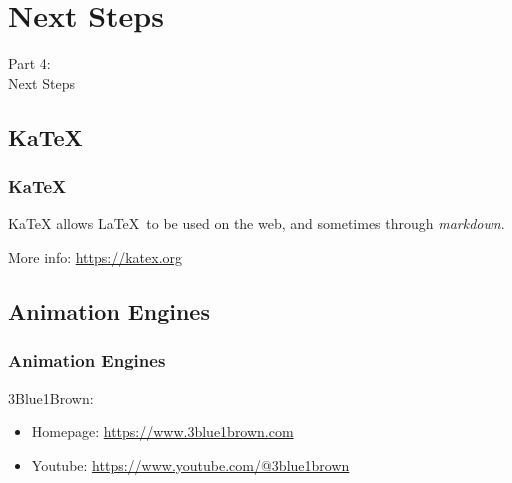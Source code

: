 {
\renewcommand{\bgcolor}{next}

\section{Next Steps}
\begin{frame}
  \vspace{25mm}
  \begin{center}
    \Huge{Part 4:\\Next Steps}
  \end{center}
\end{frame}

\subsection{KaTeX}
\begin{frame}[fragile]
  \frametitle{KaTeX}
  \vspace{3mm}
  KaTeX allows \LaTeX\ to be used on the web, and sometimes through \textsl{markdown}.
  
  \vspace{5mm}
  More info: \url{https://katex.org}
  
\end{frame}

\subsection{Animation Engines}
\begin{frame}[fragile]
  \frametitle{Animation Engines}
  \vspace{3mm}
  3Blue1Brown:
  \begin{itemize}
    \item Homepage: \textcolor{blue}{\url{https://www.3blue1brown.com}}
    \item Youtube: \textcolor{blue}{\url{https://www.youtube.com/@3blue1brown}}
  \end{itemize}
  

\end{frame}}
